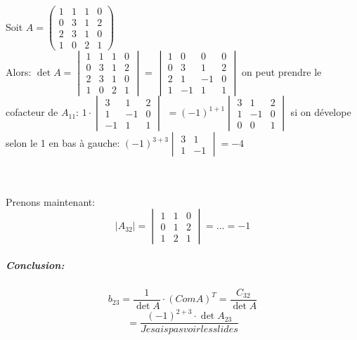\begin{exemple}

    Soit $A = \begin{pmatrix}
        1 & 1 & 1 & 0\\
        0 & 3 & 1 & 2\\
        2 & 3 & 1 & 0 \\
        1 & 0 & 2 & 1
    \end{pmatrix}$
\\
Alors: $\det A = \begin{vmatrix}
        1 & 1 & 1 & 0\\
        0 & 3 & 1 & 2\\
        2 & 3 & 1 & 0 \\
        1 & 0 & 2 & 1
\end{vmatrix}$ = $\begin{vmatrix}
        1 & 0 & 0 & 0\\
        0 & 3 & 1 & 2\\
        2 & 1 & -1 & 0 \\
        1 & -1 & 1 & 1
        \end{vmatrix}$ \hspace{0.4cm} on peut prendre le cofacteur de $A_{11}$: 
        $1\cdot \begin{vmatrix}
        3 & 1 & 2\\
        1 & -1 & 0 \\
        -1 & 1 & 1
        \end{vmatrix}$
        $=(-1)^{1+1} \begin{vmatrix}
            3 & 1 & 2 \\
            1 & -1 & 0 \\
            0 & 0 & 1
        \end{vmatrix}$ si on dévelope selon le 1 en bas à gauche:
        $  (-1)^{3+3} \begin{vmatrix}
            3 & 1 \\
            1 & -1
        \end{vmatrix} = -4$

        \\
        \\
        Prenons maintenant:
        \[|A_{32}| = \begin{vmatrix}
            1 & 1 & 0 \\
            0 & 1 & 2\\
            1 & 2 & 1
        \end{vmatrix} = \dots = -1\]
        \subparagraph{Conclusion:} 
        \[b_{23} = \frac{1}{\det A}\cdot(ComA)^T = \frac{C_{32}}{\det A}\]
        \[= \frac{(-1)^{2+3}\cdot \det A_{23}}{Je sais pas voir les slides}\]
\end{exemple}
